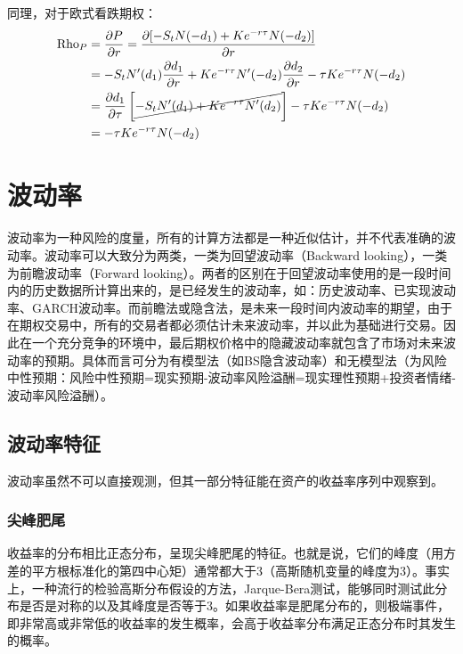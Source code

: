 \documentclass[11pt]{article}
\begin{document}
同理，对于欧式看跌期权：
\begin{align*}
    \text{Rho}_P &= \frac{\partial P}{\partial r} = 
    \frac{\partial [-S_t N(-d_1) + Ke^{-r\tau} N(-d_2)]}{\partial r} \\
    &= -S_t N'(d_1) \frac{\partial d_1}{\partial r} + Ke^{-r\tau} N'(-d_2)\frac{\partial d_2}{\partial r} - \tau Ke^{-r\tau} N(-d_2) \\
    &= \frac{\partial d_1}{\partial \tau} \left[\cancel{-S_t N'(d_1) + Ke^{-r\tau} N'(d_2) } \right] - \tau K e^{-r\tau} N(-d_2) \\
    &= -\tau K e^{-r\tau} N(-d_2)
\end{align*}

\section{波动率}

波动率为一种风险的度量，所有的计算方法都是一种近似估计，并不代表准确的波动率。波动率可以大致分为两类，一类为回望波动率（Backward looking），一类为前瞻波动率（Forward looking）。两者的区别在于回望波动率使用的是一段时间内的历史数据所计算出来的，是已经发生的波动率，如：历史波动率、已实现波动率、GARCH波动率。而前瞻法或隐含法，是未来一段时间内波动率的期望，由于在期权交易中，所有的交易者都必须估计未来波动率，并以此为基础进行交易。因此在一个充分竞争的环境中，最后期权价格中的隐藏波动率就包含了市场对未来波动率的预期。具体而言可分为有模型法（如BS隐含波动率）和无模型法（为风险中性预期：风险中性预期=现实预期-波动率风险溢酬=现实理性预期+投资者情绪-波动率风险溢酬）。

\subsection{波动率特征}

波动率虽然不可以直接观测，但其一部分特征能在资产的收益率序列中观察到。

\subsubsection{尖峰肥尾}

收益率的分布相比正态分布，呈现尖峰肥尾的特征。也就是说，它们的峰度（用方差的平方根标准化的第四中心矩）通常都大于3（高斯随机变量的峰度为3）。事实上，一种流行的检验高斯分布假设的方法，Jarque-Bera测试，能够同时测试此分布是否是对称的以及其峰度是否等于3。如果收益率是肥尾分布的，则极端事件，即非常高或非常低的收益率的发生概率，会高于收益率分布满足正态分布时其发生的概率。
\end{document}
